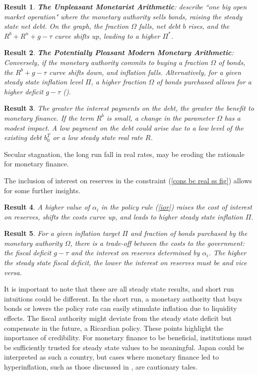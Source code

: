 \documentclass[]{article}
\newtheorem{result}{Result}
\begin{document}
\begin{result}
    \textbf{The Unpleasant Monetarist Arithmetic}:  \textcite{sargent2018recursive} describe ``one big open market operation" where the monetary authority sells bonds, raising the steady state net debt. On the graph, the fraction $\Omega$ falls, net debt $b$ rises, and the $R^{b}+R^{n}+g-\tau$ curve shifts up, leading to a higher $\Pi^{*}$.
\end{result}
\begin{result}
    \textbf{The Potentially Pleasant Modern Monetary Arithmetic}: Conversely, if the monetary authority commits to buying a fraction $\Omega$ of bonds, the $R^{b}+g-\tau$ curve shifts down, and inflation falls. Alternatively, for a given steady state inflation level $\Pi$, a higher fraction $\Omega$ of bonds purchased allows for a higher deficit $g-\tau$ (\cite{waters2024potentiallypleasant}). 
\end{result}
\begin{result}
    The greater the interest payments on the debt, the greater the benefit to monetary finance. If the term $R^{b}$ is small, a change in the parameter $\Omega$ has a modest impact. A low payment on the debt could arise due to a low level of the existing debt $b_{0}^{T}$ or a low steady state real rate $R$.
\end{result}
Secular stagnation, the long run fall in real rates, may be eroding the rationale for monetary finance.

The inclusion of interest on reserves in the constraint (\ref{cons bc real ss fig}) allows for some further insights.
\begin{result}
    A higher value of $\alpha_{i}$ in the policy rule (\ref{ior}) raises the cost of interest on reserves, shifts the costs curve up, and leads to higher steady state inflation $\Pi$.
\end{result}
\begin{result}
    For a given inflation target $\Pi$ and fraction of bonds purchased by the monetary authority $\Omega$, there is a trade-off between the costs to the government:  the fiscal deficit $g-\tau$ and the interest on reserves determined by $\alpha_{i}$. The higher the steady state fiscal deficit, the lower the interest on reserves must be and vice versa.
\end{result}

It is important to note that these are all steady state results, and short run intuitions could be different. In the short run, a monetary authority that buys bonds or lowers the policy rate can easily stimulate inflation due to liquidity effects. The fiscal authority might deviate from the steady state deficit but compensate in the future, a Ricardian policy. These points highlight the importance of credibility. For monetary finance to be beneficial, institutions must be sufficiently trusted for steady state values to be meaningful. Japan could be interpreted as such a country, but cases where monetary finance led to hyperinflation, such as those discussed in \textcite{sargent1982ends}, are cautionary tales. 
\end{document}
